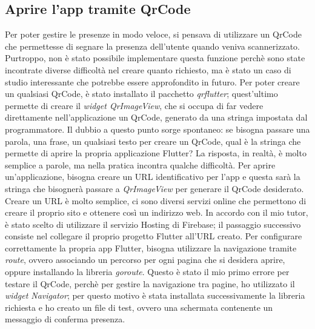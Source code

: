 \subsection{Aprire l'app tramite QrCode}
Per poter gestire le presenze in modo veloce, si pensava di utilizzare un QrCode che permettesse di segnare la presenza dell'utente quando veniva scannerizzato.\newline
Purtroppo, non è stato possibile implementare questa funzione perchè sono state incontrate diverse difficoltà nel creare quanto richiesto, ma è stato un caso di studio interessante che potrebbe essere approfondito in futuro.\newline
\newline
Per poter creare un qualsiasi QrCode, è stato installato il pacchetto \emph{qr\textunderscore flutter}; quest'ultimo permette di creare il \emph{widget QrImageView}, che si occupa di far vedere direttamente nell'applicazione un QrCode, generato da una stringa impostata dal programmatore.\newline
Il dubbio a questo punto sorge spontaneo: se bisogna passare una parola, una frase, un qualsiasi testo per creare un QrCode, qual è la stringa che permette di aprire la propria applicazione Flutter?\newline
La risposta, in realtà, è molto semplice a parole, ma nella pratica incontra qualche difficoltà.\newline
Per aprire un'applicazione, bisogna creare un URL identificativo per l'app e questa sarà la stringa che bisognerà passare a \emph{QrImageView} per generare il QrCode desiderato.\newline
\newline
Creare un URL è molto semplice, ci sono diversi servizi online che permettono di creare il proprio sito e ottenere così un indirizzo web.\newline
In accordo con il mio tutor, è stato scelto di utilizzare il servizio Hosting di Firebase; il passaggio successivo consiste nel collegare il proprio progetto Flutter all'URL creato.\newline
\newline
Per configurare correttamente la propria app Flutter, bisogna utilizzare la navigazione tramite \emph{route}, ovvero associando un percorso per ogni pagina che si desidera aprire, oppure installando la libreria \emph{go\textunderscore route}.\newline
Questo è stato il mio primo errore per testare il QrCode, perchè per gestire la navigazione tra pagine, ho utilizzato il \emph{widget Navigator}; per questo motivo è stata installata successivamente la libreria richiesta e ho creato un file di test, ovvero una schermata contenente un messaggio di conferma presenza.\newline

